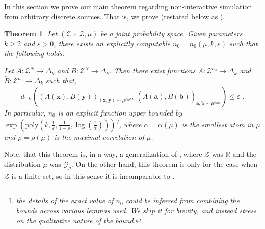 \documentclass[11pt]{article}
\newcommand{\inparen}[1]{\left ( #1 \right )}
\newcommand{\wtilde}[1]{\widetilde{#1}}
\newcommand{\dTV}{d_{\mathrm{TV}}}
\newcommand{\eps}{\varepsilon}
\newcommand{\bbR}{{\mathbb R}}
\newcommand{\ba}{{\bm a}}
\newcommand{\bb}{{\bm b}}
\newcommand{\bx}{{\bm x}}
\newcommand{\by}{{\bm y}}
\newcommand{\calG}{\mathcal{G}}
\newcommand{\calZ}{\mathcal{Z}}
\newcommand{\poly}{\mathrm{poly}}
\newtheorem{theorem}{Theorem}[section]
\begin{document}
In this section we prove our main theorem regarding non-interactive simulation from arbitrary discrete sources. That is, we prove  (restated below as ). %

\begin{theorem}\label{thm:non-int-sim}
	Let $(\calZ \times \calZ, \mu)$ be a joint probability space. Given parameters $k \ge 2$ and $\eps > 0$, there exists an explicitly computable $n_0 = n_0(\mu, k, \eps)$ such that the following holds:
	
	Let $A : \calZ^N \to \Delta_k$ and $B : \calZ^N \to \Delta_k$. Then there exist functions $\wtilde{A} : \calZ^{n_0} \to \Delta_k$ and $\wtilde{B} : \calZ^{n_0} \to \Delta_k$ such that,
	\[\dTV\inparen{(A(\bx),B(\by))_{(\bx,\by)\sim \mu^{\otimes N}}, \ (\wtilde{A}(\ba), \wtilde{B}(\bb))_{\ba, \bb \sim \mu^{\otimes n_0}}} \le \eps\;.\]
	In particular, $n_0$ is an explicit function upper bounded by $\exp\inparen{\poly\inparen{k, \frac{1}{\eps}, \frac{1}{1-\rho}, \log\inparen{\frac{1}{\alpha}}}}$\footnote{the details of the exact value of $n_0$ could be inferred from combining the bounds across various lemmas used. We skip it for brevity, and instead stress on the qualitative nature of the bound.}, where $\alpha = \alpha(\mu)$ is the smallest atom in $\mu$ and $\rho = \rho(\mu)$ is the maximal correlation of $\mu$.
\end{theorem}

\noindent Note, that this theorem is, in a way, a generalization of , where $\calZ$ was $\bbR$ and the distribution $\mu$ was $\calG_\rho$. On the other hand, this theorem is only for the case when $\calZ$ is a finite set, so in this sense it is incomparable to .\\
\end{document}
